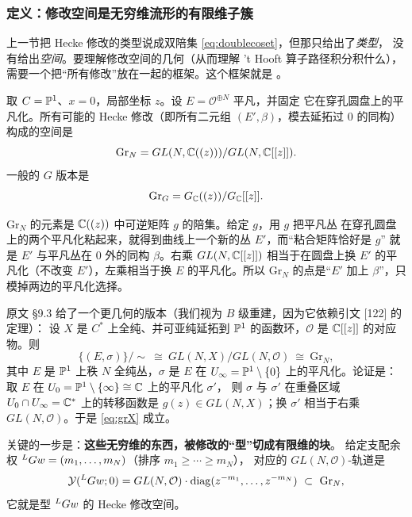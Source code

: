 \subsubsection{定义：修改空间是无穷维流形的有限维子簇}

上一节把 Hecke 修改的类型说成双陪集 \eqref{eq:doublecoset}，但那只给出了\emph{类型}，
没有给出\emph{空间}。要理解修改空间的几何（从而理解 't Hooft{} 算子路径积分积什么），
需要一个把“所有修改”放在一起的框架。这个框架就是
。

取 $C=\mathbb{P}^1$、$x=0$，局部坐标 $z$。设 $E=\mathcal{O}^{\oplus N}$ 平凡，并固定
它在穿孔圆盘上的平凡化。所有可能的 Hecke 修改（即所有二元组 $(E',\beta)$，模去延拓过
$0$ 的同构）构成的空间是
\begin{equation}
\mathrm{Gr}_N=GL(N,\mathbb{C}((z)))/GL(N,\mathbb{C}[[z]]).
\label{eq:grN}
\end{equation}
一般的 $G$ 版本是
\begin{equation}
\mathrm{Gr}_G=G_{\mathbb{C}}((z))/G_{\mathbb{C}}[[z]].
\label{eq:grG}
\end{equation}
\pA{}

\begin{remark}
$\mathrm{Gr}_N$ 的元素是 $\mathbb{C}((z))$ 中可逆矩阵 $g$ 的陪集。给定 $g$，用 $g$ 把平凡丛
在穿孔圆盘上的两个平凡化粘起来，就得到曲线上一个新的丛 $E'$，而“粘合矩阵恰好是 $g$”
就是 $E'$ 与平凡丛在 $0$ 外的同构 $\beta$。右乘 $GL(N,\mathbb{C}[[z]])$ 相当于在圆盘上换
$E'$ 的平凡化（不改变 $E'$），左乘相当于换 $E$ 的平凡化。所以 $\mathrm{Gr}_N$
的点是“$E'$ 加上 $\beta$”，只模掉两边的平凡化选择。\pA{}
\end{remark}

原文 §9.3 给了一个更几何的版本（我们视为 $B$ 级重建，因为它依赖引文 [122] 的定理）：
设 $X$ 是 $C^*$ 上全纯、并可亚纯延拓到 $\mathbb{P}^1$ 的函数环，$\mathcal{O}$ 是 $\mathbb{C}[[z]]$
的对应物。则
\begin{equation}
\bigl\{(E,\sigma)\bigr\}/\sim\ \cong\ GL(N,X)/GL(N,\mathcal{O})\ \cong\ \mathrm{Gr}_N,
\label{eq:grX}
\end{equation}
其中 $E$ 是 $\mathbb{P}^1$ 上秩 $N$ 全纯丛，$\sigma$ 是 $E$ 在 $U_\infty=\mathbb{P}^1\setminus\{0\}$
上的平凡化。论证是：取 $E$ 在 $U_0=\mathbb{P}^1\setminus\{\infty\}\cong\mathbb{C}$ 上的平凡化 $\sigma'$，
则 $\sigma$ 与 $\sigma'$ 在重叠区域 $U_0\cap U_\infty=\mathbb{C}^*$ 上的转移函数是
$g(z)\in GL(N,X)$；换 $\sigma'$ 相当于右乘 $GL(N,\mathcal{O})$。于是
\eqref{eq:grX} 成立。\pB{}

关键的一步是：\textbf{这些无穷维的东西，被修改的“型”切成有限维的块}。
给定支配余权 ${}^{L}G w=(m_1,\dots,m_N)$（排序 $m_1\ge\cdots\ge m_N$），
对应的 $GL(N,\mathcal{O})$-轨道是
\begin{equation}
\mathcal{Y}({}^{L}G w;0)=GL(N,\mathcal{O})\cdot
\mathrm{diag}(z^{-m_1},\dots,z^{-m_N})
\ \subset\ \mathrm{Gr}_N,
\label{eq:orbit}
\end{equation}
它就是型 ${}^{L}G w$ 的 Hecke 修改空间。\pA{}

